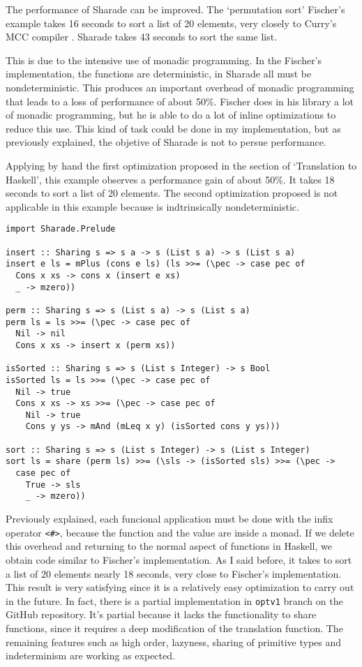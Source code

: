 \documentclass[class=article, crop=false]{standalone}
\begin{document}
The performance of Sharade can be improved. The `permutation sort' Fischer's example takes
16 seconds to sort a list of 20 elements, very closely to Curry's MCC
compiler \cite{lux2003munster}. Sharade takes 43 seconds to sort the same list.

This is due to the intensive use of monadic programming. In the Fischer's implementation, the
functions are deterministic, in Sharade all must be nondeterministic. This produces an
important overhead of monadic programming that leads to a loss of performance of about 50\%.
Fischer does in his library a lot of monadic programming, but he is able to do a lot of
inline optimizations to reduce this use. This kind of task could be done in my
implementation, but as previously explained, the objetive of Sharade is not to persue
performance.

Applying by hand the first optimization proposed in the section of `Translation to Haskell',
this example observes a performance gain of about 50\%. It takes 18 seconds to sort a list of
20 elements. The second optimization proposed is not applicable in this example because is
indtrinsically nondeterministic.

\begin{verbatim}
import Sharade.Prelude

insert :: Sharing s => s a -> s (List s a) -> s (List s a)
insert e ls = mPlus (cons e ls) (ls >>= (\pec -> case pec of
  Cons x xs -> cons x (insert e xs)
  _ -> mzero))

perm :: Sharing s => s (List s a) -> s (List s a)
perm ls = ls >>= (\pec -> case pec of
  Nil -> nil
  Cons x xs -> insert x (perm xs))

isSorted :: Sharing s => s (List s Integer) -> s Bool
isSorted ls = ls >>= (\pec -> case pec of
  Nil -> true
  Cons x xs -> xs >>= (\pec -> case pec of
    Nil -> true
    Cons y ys -> mAnd (mLeq x y) (isSorted cons y ys)))

sort :: Sharing s => s (List s Integer) -> s (List s Integer)
sort ls = share (perm ls) >>= (\sls -> (isSorted sls) >>= (\pec ->
  case pec of
    True -> sls
    _ -> mzero))
\end{verbatim}

Previously explained, each funcional application must be done with the infix operator
\verb`<#>`, because the function and the value are inside a monad. If we delete this overhead
and returning to the normal aspect of functions in Haskell, we obtain code similar to
Fischer's implementation. As I said before, it takes to sort a list of 20 elements nearly
18 seconds, very close to Fischer's implementation. This result is very satisfying since it
is a relatively easy optimization to carry out in the future. In fact, there is a partial
implementation in \verb`optv1` branch on the GitHub repository. It's partial because it lacks
the functionality to share functions, since it requires a deep modification of the
translation function. The remaining features such as high order, lazyness, sharing of
primitive types and indeterminism are working as expected.
\end{document}
